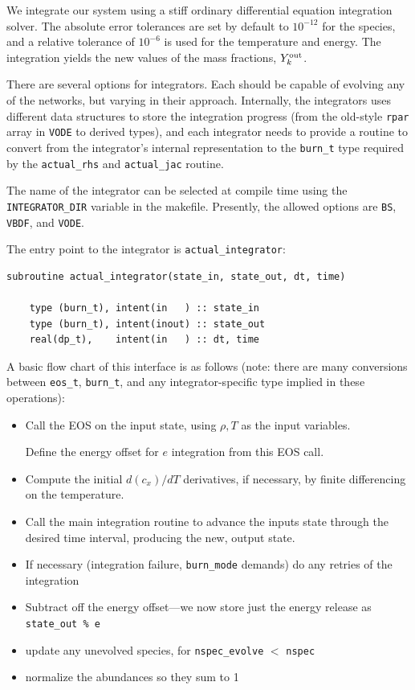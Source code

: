 We integrate our system using a stiff ordinary differential equation
integration solver. The absolute error tolerances are set by default
to $10^{-12}$ for the species, and a relative tolerance of $10^{-6}$
is used for the temperature and energy.  The integration yields the
new values of the mass fractions, $Y_k^{\rm out}$.

There are several options for integrators.  Each should be capable of
evolving any of the networks, but varying in their approach.  Internally,
the integrators uses different data structures to store the integration
progress (from the old-style {\tt rpar} array in {\tt VODE} to derived
types), and each integrator needs to provide a routine to convert
from the integrator's internal representation to the {\tt burn\_t}
type required by the {\tt actual\_rhs} and {\tt actual\_jac} routine.

The name of the integrator can be selected at compile time using
the {\tt INTEGRATOR\_DIR} variable in the makefile.  Presently,
the allowed options are {\tt BS}, {\tt VBDF}, and {\tt VODE}.

The entry point to the integrator is {\tt actual\_integrator}:
\begin{lstlisting}[language={[95]fortran}]
  subroutine actual_integrator(state_in, state_out, dt, time)

    type (burn_t), intent(in   ) :: state_in
    type (burn_t), intent(inout) :: state_out
    real(dp_t),    intent(in   ) :: dt, time
\end{lstlisting}
A basic flow chart of this interface is as follows (note: there are
many conversions between {\tt eos\_t}, {\tt burn\_t}, and any
integrator-specific type implied in these operations):
\begin{itemize}
  \item Call the EOS on the input state, using $\rho, T$ as the input
    variables.  

    Define the energy offset for $e$ integration from this EOS call.

  \item Compute the initial $d(c_x)/dT$ derivatives, if necessary, by
    finite differencing on the temperature.

  \item Call the main integration routine to advance the inputs state
    through the desired time interval, producing the new, output
    state.

  \item If necessary (integration failure, {\tt burn\_mode} demands)
    do any retries of the integration

  \item Subtract off the energy offset---we now store just the
    energy release as {\tt state\_out \% e}

  \item update any unevolved species, for {\tt nspec\_evolve} $<$
    {\tt nspec}

  \item normalize the abundances so they sum to 1
\end{itemize}

